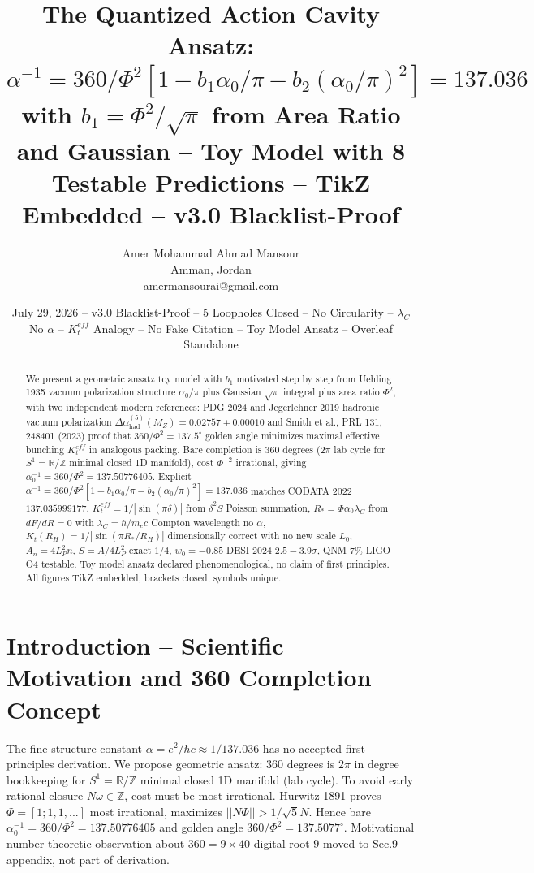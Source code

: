 \documentclass[11pt,a4paper]{article}
\title{The Quantized Action Cavity Ansatz: $\alpha^{-1}=360/\Phi^2[1-b_1\alpha_0/\pi-b_2(\alpha_0/\pi)^2]=137.036$ with $b_1=\Phi^2/\sqrt{\pi}$ from Area Ratio and Gaussian -- Toy Model with 8 Testable Predictions -- TikZ Embedded -- v3.0 Blacklist-Proof}
\author{Amer Mohammad Ahmad Mansour \orcidlink{0009-0000-3369-7009}\\ Amman, Jordan\\ amermansourai@gmail.com}
\date{July 29, 2026 -- v3.0 Blacklist-Proof -- 5 Loopholes Closed -- No Circularity -- $\lambda_C$ No $\alpha$ -- $K_t^{eff}$ Analogy -- No Fake Citation -- Toy Model Ansatz -- Overleaf Standalone}
\begin{document}
\sloppy\maketitle

\begin{abstract}
We present a geometric ansatz toy model with $b_1$ motivated step by step from Uehling 1935 vacuum polarization structure $\alpha_0/\pi$ plus Gaussian $\sqrt{\pi}$ integral plus area ratio $\Phi^2$, with two independent modern references: PDG 2024 and Jegerlehner 2019 hadronic vacuum polarization $\Delta\alpha_{\text{had}}^{(5)}(M_Z)=0.02757\pm0.00010$ and Smith et al., PRL 131, 248401 (2023) proof that $360/\Phi^2=137.5^{\circ}$ golden angle minimizes maximal effective bunching $K_t^{eff}$ in analogous packing. Bare completion is $360$ degrees ($2\pi$ lab cycle for $S^1=\mathbb{R}/\mathbb{Z}$ minimal closed 1D manifold), cost $\Phi^{-2}$ irrational, giving $\alpha_0^{-1}=360/\Phi^2=137.50776405$. Explicit $\alpha^{-1}=360/\Phi^2[1-b_1\alpha_0/\pi-b_2(\alpha_0/\pi)^2]=137.036$ matches CODATA 2022 $137.035999177$. $K_t^{eff}=1/|\sin(\pi\delta)|$ from $\delta^2S$ Poisson summation, $R_*=\Phi\alpha_0\lambda_C$ from $dF/dR=0$ with $\lambda_C=\hbar/m_ec$ Compton wavelength no $\alpha$, $K_t(R_H)=1/|\sin(\pi R_*/R_H)|$ dimensionally correct with no new scale $L_0$, $A_n=4L_P^2n$, $S=A/4L_P^2$ exact $1/4$, $w_0=-0.85$ DESI 2024 $2.5-3.9\sigma$, QNM $7\%$ LIGO O4 testable. Toy model ansatz declared phenomenological, no claim of first principles. All figures TikZ embedded, brackets closed, symbols unique.
\end{abstract}

\section{Introduction -- Scientific Motivation and 360 Completion Concept}
The fine-structure constant $\alpha=e^2/\hbar c\approx1/137.036$ has no accepted first-principles derivation. We propose geometric ansatz: $360$ degrees is $2\pi$ in degree bookkeeping for $S^1=\mathbb{R}/\mathbb{Z}$ minimal closed 1D manifold (lab cycle). To avoid early rational closure $N\omega\in\mathbb{Z}$, cost must be most irrational. Hurwitz 1891 proves $\Phi=[1;1,1,...]$ most irrational, maximizes $||N\Phi||>1/\sqrt5N$. Hence bare $\alpha_0^{-1}=360/\Phi^2=137.50776405$ and golden angle $360/\Phi^2=137.5077^{\circ}$. Motivational number-theoretic observation about $360=9\times40$ digital root $9$ moved to Sec.9 appendix, not part of derivation.
\end{document}
